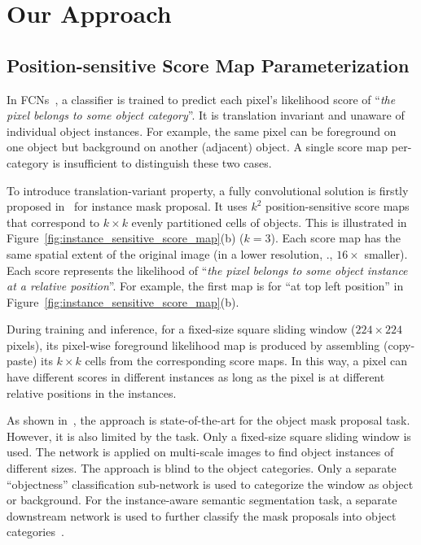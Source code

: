 \documentclass[10pt,twocolumn,letterpaper]{article}
\begin{document}
\section{Our Approach}

\subsection{Position-sensitive Score Map Parameterization}
\label{sec.position_sensitive_score_review}
In FCNs~\cite{long2015fully}, a classifier is trained to predict each pixel's likelihood score of ``\emph{the pixel belongs to some object category}''. It is translation invariant and unaware of individual object instances. For example, the same pixel can be foreground on one object but background on another (adjacent) object. A single score map per-category is insufficient to distinguish these two cases.

To introduce translation-variant property, a fully convolutional solution is firstly proposed in~\cite{dai2016instance} for instance mask proposal. It uses $k^2$ position-sensitive score maps that correspond to $k\times k$ evenly partitioned cells of objects. This is illustrated in Figure~\ref{fig:instance_sensitive_score_map}(b) ($k=3$). Each score map has the same spatial extent of the original image (in a lower resolution, \eg., $16\times$ smaller). Each score represents the likelihood of ``\emph{the pixel belongs to some object instance at a relative position}''. For example, the first map is for ``at top left position'' in Figure~\ref{fig:instance_sensitive_score_map}(b).

During training and inference, for a fixed-size square sliding window ($224\times224$ pixels), its pixel-wise foreground likelihood map is produced by assembling (copy-paste) its $k\times k$ cells from the corresponding score maps. In this way, a pixel can have different scores in different instances as long as the pixel is at different relative positions in the instances.

As shown in~\cite{dai2016instance}, the approach is state-of-the-art for the object mask proposal task. However, it is also limited by the task. Only a fixed-size square sliding window is used. The network is applied on multi-scale images to find object instances of different sizes. The approach is blind to the object categories. Only a separate ``objectness'' classification sub-network is used to categorize the window as object or background. For the instance-aware semantic segmentation task, a separate downstream network is used to further classify the mask proposals into object categories~\cite{dai2016instance}.
\end{document}

